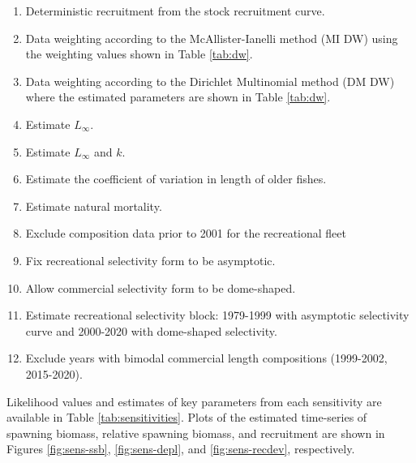 \documentclass[11pt,
  english,
  a4paper,
]{article}
\begin{document}
\begin{enumerate}
   
  \item Deterministic recruitment from the stock recruitment curve. 

  \item Data weighting according to the McAllister-Ianelli method (MI DW) using the weighting values shown in Table \ref{tab:dw}. 
  
  \item Data weighting according to the Dirichlet Multinomial method (DM DW) where the estimated parameters are shown in Table \ref{tab:dw}. 

  \item Estimate $L_{\infty}$.
  
  \item Estimate $L_{\infty}$ and $k$.

  \item Estimate the coefficient of variation in length of older fishes.

  \item Estimate natural mortality.
  
  \item Exclude composition data prior to 2001 for the recreational fleet

  \item Fix recreational selectivity form to be asymptotic. 
  
  \item Allow commercial selectivity form to be dome-shaped.

  \item Estimate recreational selectivity block: 1979-1999 with asymptotic selectivity curve and 2000-2020 with dome-shaped selectivity.   
  
  \item Exclude years with bimodal commercial length compositions (1999-2002, 2015-2020). 
  
\end{enumerate}


Likelihood values and estimates of key parameters from each sensitivity are available in Table \ref{tab:sensitivities}. Plots of the estimated time-series of spawning biomass, relative spawning biomass, and recruitment are shown in Figures \ref{fig:sens-ssb}, \ref{fig:sens-depl}, and \ref{fig:sens-recdev}, respectively.

\leavevmode\tagmcend\tagstructend\par
\end{document}
